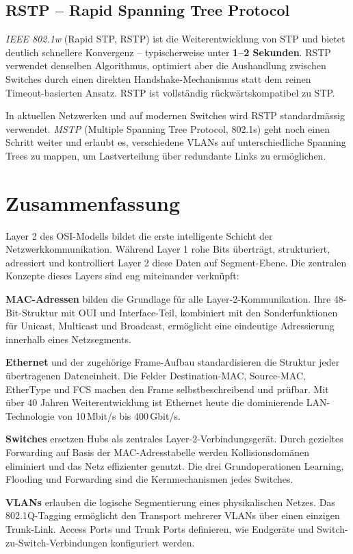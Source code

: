 \documentclass[11pt, oneside, numbers=nönddot]{scrbook}
\begin{document}
\subsection{RSTP -- Rapid Spanning Tree Protocol}
\textit{IEEE 802.1w} (Rapid STP, RSTP) ist die Weiterentwicklung von STP und bietet deutlich schnellere Konvergenz -- typischerweise unter \textbf{1--2 Sekunden}. RSTP verwendet denselben Algorithmus, optimiert aber die Aushandlung zwischen Switches durch einen direkten Handshake-Mechanismus statt dem reinen Timeout-basierten Ansatz. RSTP ist vollständig rückwärtskompatibel zu STP.

In aktuellen Netzwerken und auf modernen Switches wird RSTP standardmässig verwendet. \textit{MSTP} (Multiple Spanning Tree Protocol, 802.1s) geht noch einen Schritt weiter und erlaubt es, verschiedene VLANs auf unterschiedliche Spanning Trees zu mappen, um Lastverteilung über redundante Links zu ermöglichen.

\newpage

\section{Zusammenfassung}
Layer 2 des OSI-Modells bildet die erste intelligente Schicht der Netzwerkkommunikation. Während Layer 1 rohe Bits überträgt, strukturiert, adressiert und kontrolliert Layer 2 diese Daten auf Segment-Ebene. Die zentralen Konzepte dieses Layers sind eng miteinander verknüpft:

\textbf{MAC-Adressen} bilden die Grundlage für alle Layer-2-Kommunikation. Ihre 48-Bit-Struktur mit OUI und Interface-Teil, kombiniert mit den Sonderfunktionen für Unicast, Multicast und Broadcast, ermöglicht eine eindeutige Adressierung innerhalb eines Netzsegments.

\textbf{Ethernet} und der zugehörige Frame-Aufbau standardisieren die Struktur jeder übertragenen Dateneinheit. Die Felder Destination-MAC, Source-MAC, EtherType und FCS machen den Frame selbstbeschreibend und prüfbar. Mit über 40 Jahren Weiterentwicklung ist Ethernet heute die dominierende LAN-Technologie von 10\,Mbit/s bis 400\,Gbit/s.

\textbf{Switches} ersetzen Hubs als zentrales Layer-2-Verbindungsgerät. Durch gezieltes Forwarding auf Basis der MAC-Adresstabelle werden Kollisionsdomänen eliminiert und das Netz effizienter genutzt. Die drei Grundoperationen Learning, Flooding und Forwarding sind die Kernmechanismen jedes Switches.

\textbf{VLANs} erlauben die logische Segmentierung eines physikalischen Netzes. Das 802.1Q-Tagging ermöglicht den Transport mehrerer VLANs über einen einzigen Trunk-Link. Access Ports und Trunk Ports definieren, wie Endgeräte und Switch-zu-Switch-Verbindungen konfiguriert werden.
\end{document}
